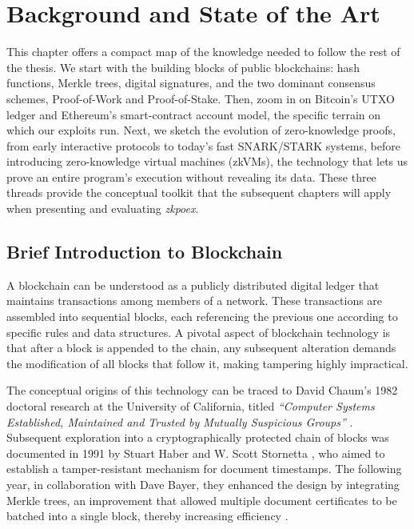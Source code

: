 \chapter{Background and State of the Art}\makeatletter{}\makeatother
\label{chap1}
This chapter offers a compact map of the knowledge needed to follow the rest of the thesis. We start with the building blocks of public blockchains: hash functions, Merkle trees, digital signatures, and the two dominant consensus schemes, Proof-of-Work and Proof-of-Stake. Then, zoom in on Bitcoin’s UTXO ledger and Ethereum’s smart-contract account model, the specific terrain on which our exploits run. Next, we sketch the evolution of zero-knowledge proofs, from early interactive protocols to today’s fast SNARK/STARK systems, before introducing zero-knowledge virtual machines (zkVMs), the technology that lets us prove an entire program’s execution without revealing its data. These three threads provide the conceptual toolkit that the subsequent chapters will apply when presenting and evaluating \textit{zkpoex}. 

\section{Brief Introduction to Blockchain}\label{sec:blockchain_intro}

A blockchain can be understood as a publicly distributed digital ledger that maintains transactions among members of a network. These transactions are assembled into sequential blocks, each referencing the previous one according to specific rules and data structures. A pivotal aspect of blockchain technology is that after a block is appended to the chain, any subsequent alteration demands the modification of all blocks that follow it, making tampering highly impractical.

The conceptual origins of this technology can be traced to David Chaum's 1982 doctoral research at the University of California, titled \textit{“Computer Systems Established, Maintained and Trusted by Mutually Suspicious Groups”} \cite{Cha82}. Subsequent exploration into a cryptographically protected chain of blocks was documented in 1991 by Stuart Haber and W. Scott Stornetta \cite{HaberStornetta1991}, who aimed to establish a tamper-resistant mechanism for document timestamps. The following year, in collaboration with Dave Bayer, they enhanced the design by integrating Merkle trees, an improvement that allowed multiple document certificates to be batched into a single block, thereby increasing efficiency \cite{HaberStornettaBayer1992}.

